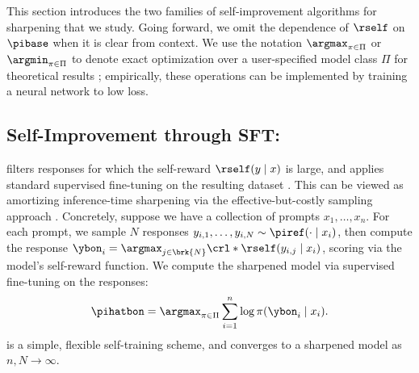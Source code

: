 \newcommand{\givebase}{}


    
This section introduces the two families of self-improvement algorithms
for sharpening
that we study. {Going forward, we omit the dependence of
  $\rself$ on $\pibase$ when it is clear from context. We use the notation $\argmax_{\pi \in \Pi}$ or $\argmin_{\pi \in \Pi}$
  to denote exact optimization over a user-specified model class
  $\Pi$ for theoretical results
  \citep{agarwal2019reinforcement,foster2023foundations}; empirically,
  these operations can be implemented by training a neural network to low loss.}




\subsection{Self-Improvement through SFT: \bestofnalg}

\label{sec:bestofn}
\bestofnalg filters responses for which the self-reward
$\rself(y\mid{}x)$ 
is large, and applies standard supervised fine-tuning on the resulting dataset
\citep{amini2024variational,sessa2024bond,gui2024bonbon,pace2024west}. This can be viewed as 
amortizing inference-time sharpening via the  effective-but-costly  \bestofn sampling approach
\citep{brown2024large,snell2024scaling,wu2024empirical}. 
Concretely, suppose we have a collection of prompts
$x_1,\ldots,x_n$. For each prompt, we sample $N$ responses
$y_{i,1},\ldots,y_{i,N}\sim\piref(\cdot\mid{}x_i)$, then compute the
\bestofn response
$\ybon_i=\argmax_{j\in\brk{N}}\crl*{\rself(y_{i,j}\mid{}x_i\givebase)}$,
scoring via the model's self-reward function. We
 compute the sharpened model via supervised fine-tuning on the \bestofn responses:
\begin{align}
  \pihatbon = \argmax_{\pi \in \Pi}\sum_{i=1}^{n}\log \pi(\ybon_i\mid{}x_i\givebase).
\end{align}
\arxiv{\bestofnalg} is a simple, flexible self-training scheme, and
converges to a sharpened model as $n, N\to \infty$.\loose





